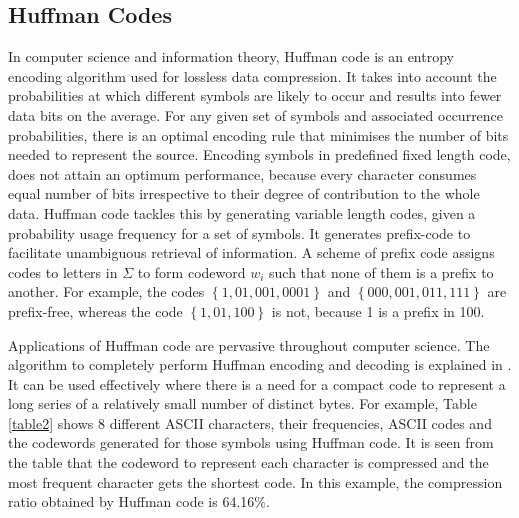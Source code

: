 \documentclass[twocolumn,12pt,a4paper]{article}
\begin{document}
\subsection{Huffman Codes}
In computer science and information theory, Huffman code is an entropy encoding algorithm used for lossless data compression. It takes into account the probabilities at which different symbols are likely to occur and results into fewer data bits on the average. 
For any given set of symbols and associated occurrence probabilities, there is an optimal encoding rule that minimises the number of bits needed to represent the source. Encoding symbols in predefined fixed length code, does not attain an optimum performance, because every character consumes equal number of bits irrespective to their degree of contribution to the whole data. Huffman code tackles this by generating variable length codes, given a probability usage frequency for a set of symbols. It generates prefix-code to facilitate unambiguous retrieval of information. A scheme of prefix code assigns codes to letters in $\Sigma$ to form codeword $w_i$ such that none of them is a prefix to another. For example, the codes $\left\{ 1,01,001,0001\right\}$ and $\left\{ 000,001,011,111\right\}$ are prefix-free, whereas the code $\left\{ 1,01,100\right\}$ is not, because 1 is a prefix in 100.

Applications of Huffman code are pervasive throughout
computer science. The algorithm to completely perform Huffman encoding and decoding is explained in \citep{Amst86}. It can be used effectively where there is a need for a compact code to represent a long series of a relatively small number of distinct bytes. For example, Table \ref{table2} shows 8 different ASCII characters, their frequencies, ASCII codes and the codewords generated for those symbols using Huffman code. It is seen from the table that the codeword to represent each character is compressed and the most frequent character gets the shortest code. In this example, the compression ratio obtained by Huffman code is 64.16\%.   
\end{document}
